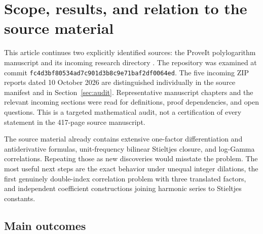 \section{Scope, results, and relation to the source material}
\label{sec:scope}

This article continues two explicitly identified sources: the ProveIt
polylogarithm manuscript and its incoming research directory
\cite{proveit-manuscript,proveit-incoming}.  The repository was examined at
commit \nolinkurl{fc4d3bf80534ad7c901d3b8c9e71baf2df0064ed}.  The five incoming
ZIP reports dated 10 October 2026 are distinguished individually in the
source manifest and in Section~\ref{sec:audit}.  Representative manuscript
chapters and the relevant incoming sections were read for definitions,
proof dependencies, and open questions.  This is a targeted mathematical
audit, not a certification of every statement in the 417-page source
manuscript.

The source material already contains extensive one-factor differentiation
and antiderivative formulas, unit-frequency bilinear Stieltjes closure,
and log-Gamma correlations.  Repeating those as new discoveries would
misstate the problem.  The most useful next steps are the exact behavior
under unequal integer dilations, the first genuinely double-index
correlation problem with three translated factors, and independent
coefficient constructions joining harmonic series to Stieltjes constants.

\subsection{Main outcomes}

